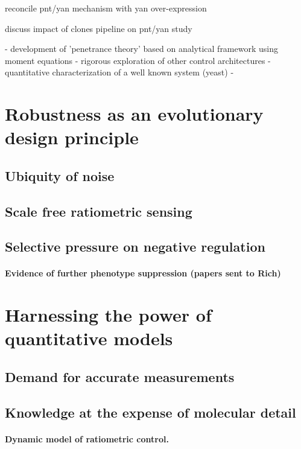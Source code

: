 
reconcile pnt/yan mechanism with yan over-expression

discuss impact of clones pipeline on pnt/yan study


- development of 'penetrance theory' based on analytical framework using moment equations
- rigorous exploration of other control architectures
- quantitative characterization of a well known system (yeast)
-


\section{Robustness as an evolutionary design principle}

	\subsection{Ubiquity of noise}	
	
	\subsection{Scale free ratiometric sensing}
	
	\subsection{Selective pressure on negative regulation}
	
		\paragraph{Evidence of further phenotype suppression (papers sent to Rich)}

\section{Harnessing the power of quantitative models}

	\subsection{Demand for accurate measurements}
	
	\subsection{Knowledge at the expense of molecular detail}
		\paragraph{Dynamic model of ratiometric control.}		
		

